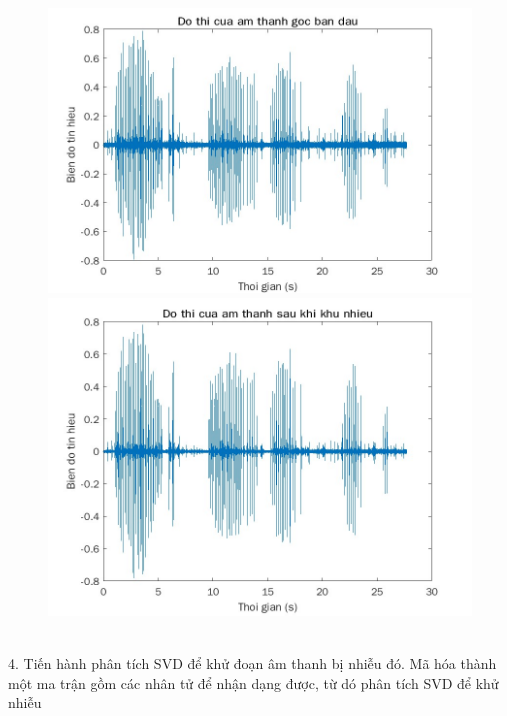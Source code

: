 \begin{figure}[!ht]
	\begin{minipage}[b]{0.4\textwidth}
		\centering
		\includegraphics[scale=0.33]{goc1}
	\end{minipage}
	\hfill
	\begin{minipage}[b]{0.4\textwidth}
		\centering
		\includegraphics[scale=0.3]{khu}
	\end{minipage}
\end{figure}\\
4. Tiến hành phân tích SVD để khử đoạn âm thanh bị nhiễu đó. Mã hóa thành một ma trận gồm các nhân tử để nhận dạng được, từ dó phân tích SVD để khử nhiễu\\
